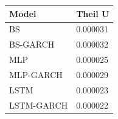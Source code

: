 \begin{tabular}{ll}
\toprule
Model & Theil U \\
\midrule
BS & 0.000031 \\
BS-GARCH & 0.000032 \\
MLP & 0.000025 \\
MLP-GARCH & 0.000029 \\
LSTM & 0.000023 \\
LSTM-GARCH & 0.000022 \\
\bottomrule
\end{tabular}
